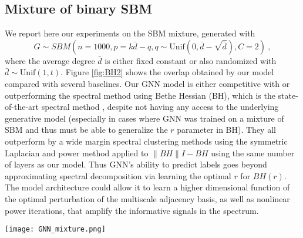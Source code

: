 \documentclass{article} \usepackage{iclr2019_conference,times}
\begin{document}
\subsection{Mixture of binary SBM}
\label{sec:furthersbm}
We report here our experiments on the SBM mixture, generated with 
$$G \sim SBM(n=1000, p = k\bar{d} - q, q \sim \text{Unif}(0, \bar{d} - \sqrt{\bar{d}}), C=2)~,$$
where the average degree $\bar{d}$ is either fixed constant or also randomized with $\bar{d} \sim \text{Unif}(1, t)$. 
Figure \ref{fig:BH2} shows the overlap obtained by our model compared with several baselines. Our GNN model is either competitive with or outperforming the spectral method using Bethe Hessian (BH), which is the state-of-the-art spectral method \cite{saade2014spectral}, despite not having any access to the underlying generative model (especially in cases where GNN was trained on a mixture of SBM and thus must be able to generalize the $r$ parameter in BH). They all outperform by a wide margin spectral clustering methods using the symmetric Laplacian and power method applied to $\|BH\| I - BH$ using the same number of layers as our model. Thus GNN's ability to predict labels goes beyond approximating spectral decomposition via learning the optimal $r$ for $BH(r)$. The model architecture could allow it to learn a higher dimensional function of the optimal perturbation of the multiscale adjacency basis, as well as nonlinear power iterations, that amplify the informative signals in the spectrum. 


\begin{figure*}
     \centering
     \texttt{[image: GNN\_mixture.png]}
\caption{GNN mixture (Graph Neural Network trained on a mixture of SBM with average degree 3), GNN full mixture (GNN trained over different SNR regimes), $BH(\sqrt{\bar{d}})$ and $BH(-\sqrt{\bar{d}})$. {\it left: $k=2$}. We verify that $BH(r)$ models cannot perform detection at both ends of the spectrum simultaneously.}
     \label{fig:BH2}
\end{figure*}
\end{document}
